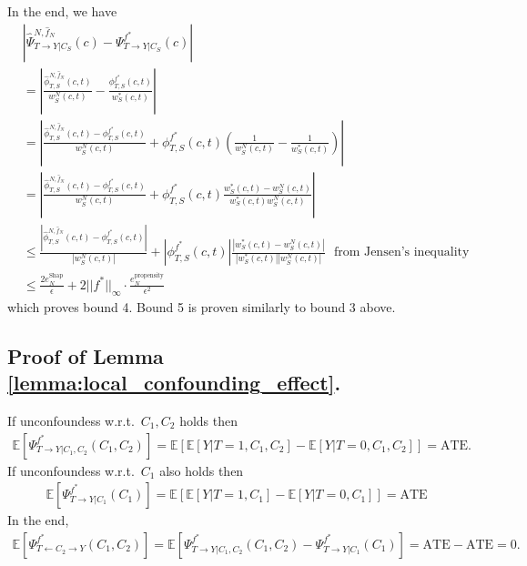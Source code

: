 \documentclass{article}
\theoremstyle{plain}
\theoremstyle{definition}
\theoremstyle{remark}
\newcommand{\effect}{\Psi}
\theoremstyle{mystyle}
\newcommand{\coalitionshapley}[4]{\phi^{#1}_{#3,#2}(#4)}
\newcommand{\estcoalitionshapley}[5]{\hat{\phi}^{#1,#2}_{#4,#3}(#5)}
\begin{document}
In the end, we have
\begin{align*}
   &|\hat{\effect}^{N,\hat{f}_N}_{ T \rightarrow Y | C_S}(c)  - \effect^{f^*}_{ T \rightarrow Y | C_S}(c)|\\
   &=  | \frac{\estcoalitionshapley{N}{\hat{f}_N}{S}{T}{c,t}}{w^N_S(c,t)} - \frac{\coalitionshapley{f^*}{S}{T}{c,t}}{w^*_S(c,t)} | \\
   &= | \frac{\estcoalitionshapley{N}{\hat{f}_N}{S}{T}{c,t} - \coalitionshapley{f^*}{S}{T}{c,t}}{w^N_S(c,t)} + \coalitionshapley{f^*}{S}{T}{c,t}(\frac{1}{w^N_S(c,t)}-\frac{1}{w^*_S(c,t)}) | \\
    &= | \frac{\estcoalitionshapley{N}{\hat{f}_N}{S}{T}{c,t} - \coalitionshapley{f^*}{S}{T}{c,t}}{w^N_S(c,t)} + \coalitionshapley{f^*}{S}{T}{c,t}\frac{w^*_S(c,t) - w^N_S(c,t)}{w^*_S(c,t) w^N_S(c,t)} | \\
    &\leq \frac{|\estcoalitionshapley{N}{\hat{f}_N}{S}{T}{c,t} - \coalitionshapley{f^*}{S}{T}{c,t}|}{|w^N_S(c,t)|} + |\coalitionshapley{f^*}{S}{T}{c,t}|\frac{|w^*_S(c,t) - w^N_S(c,t)|}{|w^*_S(c,t)| |w^N_S(c,t)|}  \ \  \ \text{from Jensen's inequality} \\
    &\leq \frac{2e^\text{Shap}_N}{\epsilon} + 2||f^*||_\infty \cdot \frac{e^\text{propensity}_N}{\epsilon^2}
\end{align*}
which proves bound 4. Bound 5 is proven similarly to bound 3 above.



\subsection{Proof of Lemma \ref{lemma:local_confounding_effect}.}

\label{proof:local_confounding_effect}
If unconfoundess w.r.t.~$C_1, C_2$ holds then
\begin{align*}
    \mathbb{E}[\effect^{f^*}_{T \rightarrow Y | C_1, C_2}(C_1, C_2)] = \mathbb{E}[\mathbb{E}[Y|T=1,C_1,C_2] - \mathbb{E}[Y|T=0,C_1,C_2]] = \text{ATE}.
\end{align*}
If unconfoundess w.r.t.~$C_1$ also holds then
\begin{align*}
    \mathbb{E}[\effect^{f^*}_{T \rightarrow Y | C_1}(C_1)] = \mathbb{E}[\mathbb{E}[Y|T=1,C_1] - \mathbb{E}[Y|T=0,C_1]] = \text{ATE}
\end{align*}
In the end,
\begin{align*}
    \mathbb{E}[\effect^{f^*}_{T \leftarrow C_2 \rightarrow Y}(C_1,C_2)] = \mathbb{E}[\effect^{f^*}_{T \rightarrow Y | C_1, C_2}(C_1, C_2) - \effect^{f^*}_{T \rightarrow Y | C_1}(C_1)] = \text{ATE} - \text{ATE} = 0.
 \end{align*}
 
\end{document}

